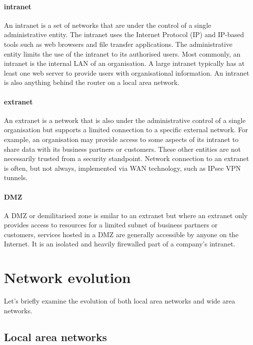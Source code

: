 {\paragraph{intranet}
An intranet is a set of networks that are under the control of a single administrative entity.
The intranet uses the Internet Protocol (IP) and IP-based tools such as web browsers and file transfer applications.
The administrative entity limits the use of the intranet to its authorised users.
Most commonly, an intranet is the internal LAN of an organisation.
A large intranet typically has at least one web server to provide users with organisational information.
An intranet is also anything behind the router on a local area network.

\paragraph{extranet}
An extranet is a network that is also under the administrative control of a single organisation but supports a limited connection to a specific external network.
For example, an organisation may provide access to some aspects of its intranet to share data with its business partners or customers.
These other entities are not necessarily trusted from a security standpoint.
Network connection to an extranet is often, but not always, implemented via WAN technology, such as IPsec VPN tunnels.

\paragraph{DMZ}
A DMZ or demilitarised zone is smilar to an extranet but where an extranet only provides access to resources for a limited subnet of business partners or customers, services hosted in a DMZ are generally accessible by anyone on the Internet.
It is an isolated and heavily firewalled part of a company's intranet.

\section{Network evolution}
\label{sec:network-evolution}

Let's briefly examine the evolution of both local area networks and wide area networks.

\subsection{Local area networks}
\label{sec:network-evolution-lan}

}
